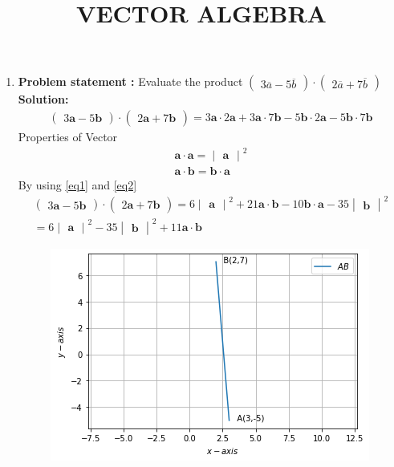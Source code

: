 \documentclass[12pt]{article}\usepackage{graphicx}
\title{\mytitle}
\newcommand{\myvec}[1]{\ensuremath{\begin{pmatrix}#1\end{pmatrix}}}
\let\vec\mathbf
\let\vec\mathbf
\newcommand{\solution}{\noindent \textbf{Solution: }}
\newcommand{\mydet}[1]{\ensuremath{\begin{vmatrix}#1\end{vmatrix}}}
\begin{document}
\begin{center}
\title{\textbf{VECTOR ALGEBRA}}
\maketitle
\end{center}
\begin{enumerate}
\item\textbf{Problem statement :} Evaluate the product $\myvec{3\overline{a}-5\overline{b}}\cdot\myvec{2\overline{a}+7\overline{b}}$
\solution
\begin{align}
    \myvec{3\vec{a}-5\vec{b}}\cdot\myvec{2\vec{a}+7\vec{b}}= 3\vec{a}\cdot2\vec{a}+3\vec{a}\cdot7\vec{b}-5\vec{b}\cdot2\vec{a}-5\vec{b}\cdot7\vec{b}
\end{align}
Properties of Vector
\begin{align}
    \vec{a}\cdot\vec{a} = \mydet{\vec{a}}^2
    \label{eq1}  
    \\
    \vec{a}\cdot\vec{b} = \vec{b}\cdot\vec{a}
    \label{eq2}
\end{align}
By using \eqref{eq1} and \eqref{eq2}
\begin{align}
    \myvec{3\vec{a}-5\vec{b}}\cdot\myvec{2\vec{a}+7\vec{b}} = 6\mydet{\vec{a}}^2 +21\vec{a}\cdot\vec{b}-10\vec{b}\cdot\vec{a}-35\mydet{\vec{b}}^2 \\
     =6\mydet{\vec{a}}^2-35\mydet{\vec{b}}^2+11\vec{a}\cdot\vec{b}
\end{align}
\begin{figure}[!h]
 \begin{center}
  \includegraphics[width=\columnwidth]{./fig.png}
 \end{center}
\caption{}
\label{fig:Fig1}
\end{figure}
\end{enumerate}
\end{document}
